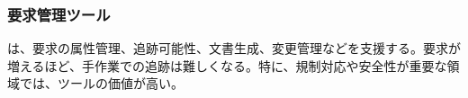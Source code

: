 \subsubsection{要求管理ツール}

は、要求の属性管理、追跡可能性、文書生成、変更管理などを支援する。要求が増えるほど、手作業での追跡は難しくなる。特に、規制対応や安全性が重要な領域では、ツールの価値が高い。
